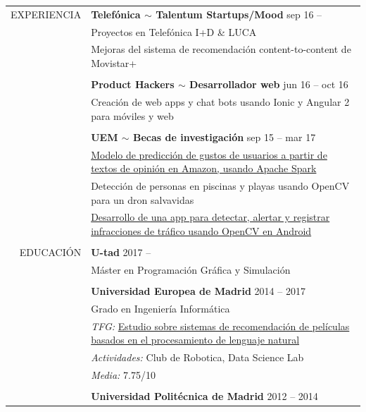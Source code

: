 \documentclass[a4paper, 12pt]{article}
\begin{document}
\begin{longtable}{r|p{12cm}}
    EXPERIENCIA
    & \textbf{Telefónica $\sim$ Talentum Startups/Mood} \hfill sep 16 --
    \\
    & Proyectos en Telefónica I+D \& LUCA
    \\
    & Mejoras del sistema de recomendación content-to-content de Movistar+
    \\\\
    & \textbf{Product Hackers $\sim$ Desarrollador web} \hfill jun 16 -- oct 16
    \\
    & Creación de web apps y chat bots usando Ionic y Angular 2 para móviles y web
    \\\\
    & \textbf{UEM $\sim$ Becas de investigación} \hfill sep 15 -- mar 17
    \\
    & \href{https://www.researchgate.net/publication/314142014_Prediction_of_User_Opinion_for_Products_-_A_Bag-of-Words_and_Collaborative_Filtering_based_Approach}{Modelo de predicción de gustos de usuarios a partir de textos de opinión en Amazon, usando Apache Spark}
    \\
    & Detección de personas en piscinas y playas usando OpenCV para un dron salvavidas
    \\
    & \href{https://github.com/hugo19941994/infrac-coche}{Desarrollo de una app para detectar, alertar y registrar infracciones de tráfico usando OpenCV en Android}
    \\\\
    EDUCACIÓN
    & \textbf{U-tad} \hfill 2017 --
    \\
    & Máster en Programación Gráfica y Simulación
    \\\\
    & \textbf{Universidad Europea de Madrid} \hfill 2014 -- 2017
    \\
    & Grado en Ingeniería Informática
    \\
    & \textit{TFG:} \href{https://github.com/hugo19941994/movie-pepper-doc/raw/master/thesis.pdf}{Estudio sobre sistemas de recomendación de películas basados en el procesamiento de lenguaje natural}
    \\
    & \textit{Actividades:} Club de Robotica, Data Science Lab
    \\
    & \textit{Media:} 7.75/10
    \\\\
    & \textbf{Universidad Politécnica de Madrid} \hfill 2012 -- 2014
    \\

\end{longtable}
\end{document}
